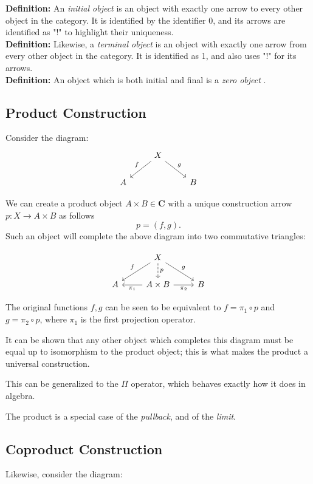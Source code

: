 \documentclass[]{article}
\newcommand{\what}{}
\newcommand{\cat}[1]{\mathbf{#1}}
\newcommand{\defn}[2]{
\renewcommand{\what}{\textit{#1} }
\textbf{Definition:} #2\\
}
\newcommand{\cdr}[1]{\arrow[swap]{r}{#1}}
\newcommand{\cdl}[1]{\arrow{l}{#1}}
\begin{document}
\defn{initial object}{An \what is an object with exactly one arrow to every other object in the category. It is
identified by the identifier 0, and its arrows are identified as "!" to highlight their uniqueness.}

\defn{terminal object}{Likewise, a \what is an object with exactly one arrow from every other object in the category. It
is identified as 1, and also uses "!" for its arrows.}

\defn{zero object}{An object which is both initial and final is a \what.}



\subsection{Product Construction}
Consider the diagram:
$$\begin{tikzcd}
\phantom{} & \arrow[swap]{dl}{f} X \arrow{dr}{g} & \\
A & & B
\end{tikzcd}$$

We can create a product object $A\times B \in \cat{C}$ with a unique construction arrow $p: X \to A\times B$ as follows
$$p = (f, g) .$$ Such an object will complete the above diagram into two commutative triangles:

$$\begin{tikzcd}
\phantom{} & \arrow[swap]{dl}{f} X \arrow[dashed]{d}{p} \arrow{dr}{g} & \\
A & \cdl{\pi_1} A \times B \cdr{\pi_2} & B
\end{tikzcd}$$

The original functions $f, g$ can be seen to be equivalent to $f = \pi_1 \circ p$ and $g = \pi_2 \circ p$, where $\pi_1$
is the first projection operator.

It can  be shown that any other object which completes this diagram must be equal up to isomorphism to the product
object; this is what makes the product a universal construction.

This can be generalized to the $\Pi$ operator, which behaves exactly how it does in algebra.

The product is a special case of the \textit{pullback}, and of the \textit{limit}.

\subsection{Coproduct Construction}
Likewise, consider the diagram:
\end{document}

